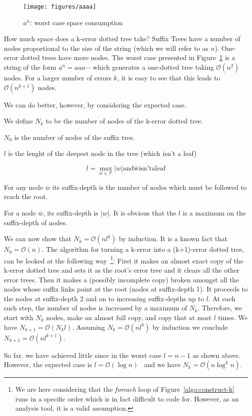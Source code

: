 \begin{figure}
\texttt{[image: figures/aaaa]}
\caption{$a^n$: worst case space consumption}%
\label{fig:aaaa}
\end{figure}

How much space does a k-error dotted tree take? Suffix Trees have a number of nodes proportional to the size of the string (which we will refer to as $n$). One-error dotted trees have more nodes. The worst case presented in Figure~\ref{fig:aaaa} is a string of the form $a^n = aaa\cdots$ which generates a one-dotted tree taking $\mathcal{O}(n^2)$ nodes. For a larger number of errors $k$, it is easy to see that this leads to $\mathcal{O}(n^{k+1})$ nodes.

We can do better, however, by considering the expected case.

\begin{definition}
We define $N_k$ to be the number of nodes of the k-error dotted tree.

$N_0$ is the number of nodes of the suffix tree.
\end{definition}

\begin{definition}
$l$ is the lenght of the deepest node in the tree (which isn't a leaf)

\[ l = \max_{\overline{w} \in \mathcal{T}} |w| \mathrm{and \overline{w} isn't a leaf} \]
\end{definition}

\begin{definition}
For any node $\overline{w}$ its suffix-depth is the number of nodes which must be followed to reach the root.
\end{definition}

For a node $\overline{w}$, its suffix-depth is $|w|$. It is obvious that the $l$ is a maximum on the suffix-depth of nodes.

We can now show that $N_k = \mathcal{O}(nl^k)$ by induction. It is a known fact that $N_0 = \mathcal{O}(n)$. The algorithm for turning a k-error into a (k+1)-error dotted tree, can be looked at the following way~\footnote{We are here considering that the \textit{foreach} loop of Figure~\ref{algo:construct-k} runs in a specific order which is in fact difficult to code for. However, as an analysis tool, it is a valid assumption.}: First it makes an almost exact copy of the k-error dotted tree and sets it as the root's error tree and it clears all the other error trees. Then it makes a (possibly incomplete copy) broken amongst all the nodes whose suffix links point at the root (nodes at suffix-depth 1). It proceeds to the nodes at suffix-depth 2 and on to increasing suffix-depths up to $l$. At each such step, the number of nodes is increased by a maximum of $N_k$. Therefore, we start with $N_k$ nodes, make an almost full copy, and copy that at most $l$ times. We have $N_{k+1}=\mathcal{O}(N_kl)$. Assuming $N_k=\mathcal{O}(nl^k)$ by induction we conclude $N_{k+1}=\mathcal{O}(nl^{k+1})$.

So far, we have achieved little since in the worst case $l=n-1$ as shown above. However, the expected case is $l=\mathcal{O}(\log n)$~\cite{apostolico92selfalignments} and we have $N_k=\mathcal{O}(n\log^k n)$.


